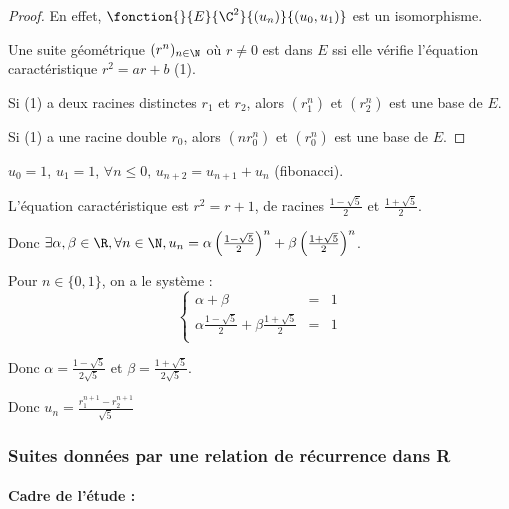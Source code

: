 \begin{proof}
    En effet, $\fonction{}{E}{\C^2}{(u_n)}{(u_0, u_1)}$ est un isomorphisme. 

    
    Une suite géométrique $(r^n)_{n \in \N}$ où $r \neq 0$ est dans $E$ ssi elle vérifie
    l'équation caractéristique $r^2 = ar + b$ (1).

    Si (1) a deux racines distinctes $r_1$ et $r_2$, alors $(r_1^n)$ et $(r_2^n)$ est une base de $E$.

    Si (1) a une racine double $r_0$, alors $(nr_0^n)$ et $(r_0^n)$ est une base de $E$.    
\end{proof}

\begin{exemple}
    $u_0 = 1$, $u_1 = 1$, $\forall n \leqslant 0, \, u_{n + 2} = u_{n + 1} + u_n$ (fibonacci).

    L'équation caractéristique est $r^2 = r + 1$, de racines $\frac{1 - \sqrt{5}} 2$ et $\frac{1 + \sqrt{5}} 2$.

    \svspace Donc $\exists \alpha, \beta \in \R, \forall n \in \N, u_n = \alpha \left(\frac{1 - \sqrt{5}} 2\right)^n + \beta \left(\frac{1 + \sqrt{5}} 2\right)^n$.

    Pour $n \in \{0, 1\}$, on a le système :
    $$\left\{
        \begin{array}{rcl}
            \alpha + \beta & = & 1 \\
            \alpha \frac{1 - \sqrt{5}} 2 + \beta \frac{1 + \sqrt{5}} 2 & = & 1 \\
        \end{array}
    \right.$$

    Donc $\alpha = \frac{1 - \sqrt{5}}{2\sqrt{5}}$ et $\beta = \frac{1 + \sqrt{5}}{2\sqrt{5}}$.
    
    Donc $\displaystyle u_n = \frac{r_1^{n + 1} - r_2^{n + 1}}{\sqrt 5}$
\end{exemple}

\subsubsection{Suites données par une relation de récurrence dans R}

\paragraph{Cadre de l'étude :}

